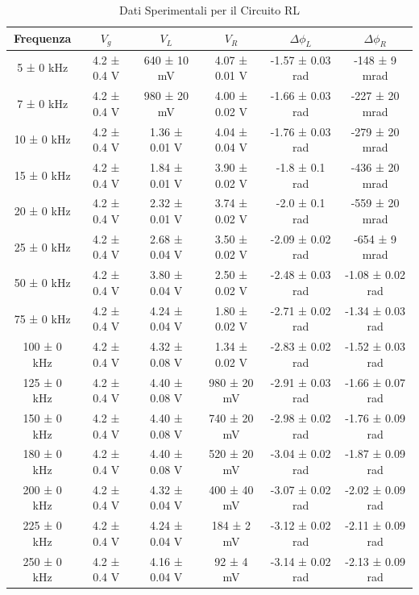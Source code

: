 \documentclass[a4paper]{article}
\begin{document}
\begin{table}[htbp]
    \centering
    \begin{tabular}{|c|c|c|c|c|c|}
    \hline
    Frequenza & $V_g$ & $V_L$ & $V_R$ & $\Delta\phi_L$ & $\Delta\phi_R$ \\\hline\hline
    5 ± 0 kHz & 4.2 ± 0.4 V & 640 ± 10 mV & 4.07 ± 0.01 V & -1.57 ± 0.03 rad & -148 ± 9 mrad \\
    7 ± 0 kHz & 4.2 ± 0.4 V & 980 ± 20 mV & 4.00 ± 0.02 V & -1.66 ± 0.03 rad & -227 ± 20 mrad \\
    10 ± 0 kHz & 4.2 ± 0.4 V & 1.36 ± 0.01 V & 4.04 ± 0.04 V & -1.76 ± 0.03 rad & -279 ± 20 mrad \\
    15 ± 0 kHz & 4.2 ± 0.4 V & 1.84 ± 0.01 V & 3.90 ± 0.02 V & -1.8 ± 0.1 rad & -436 ± 20 mrad \\
    20 ± 0 kHz & 4.2 ± 0.4 V & 2.32 ± 0.01 V & 3.74 ± 0.02 V & -2.0 ± 0.1 rad & -559 ± 20 mrad \\
    25 ± 0 kHz & 4.2 ± 0.4 V & 2.68 ± 0.04 V & 3.50 ± 0.02 V & -2.09 ± 0.02 rad & -654 ± 9 mrad \\
    50 ± 0 kHz & 4.2 ± 0.4 V & 3.80 ± 0.04 V & 2.50 ± 0.02 V & -2.48 ± 0.03 rad & -1.08 ± 0.02 rad \\
    75 ± 0 kHz & 4.2 ± 0.4 V & 4.24 ± 0.04 V & 1.80 ± 0.02 V & -2.71 ± 0.02 rad & -1.34 ± 0.03 rad \\
    100 ± 0 kHz & 4.2 ± 0.4 V & 4.32 ± 0.08 V & 1.34 ± 0.02 V & -2.83 ± 0.02 rad & -1.52 ± 0.03 rad \\
    125 ± 0 kHz & 4.2 ± 0.4 V & 4.40 ± 0.08 V & 980 ± 20 mV & -2.91 ± 0.03 rad & -1.66 ± 0.07 rad \\
    150 ± 0 kHz & 4.2 ± 0.4 V & 4.40 ± 0.08 V & 740 ± 20 mV & -2.98 ± 0.02 rad & -1.76 ± 0.09 rad \\
    180 ± 0 kHz & 4.2 ± 0.4 V & 4.40 ± 0.08 V & 520 ± 20 mV & -3.04 ± 0.02 rad & -1.87 ± 0.09 rad \\
    200 ± 0 kHz & 4.2 ± 0.4 V & 4.32 ± 0.04 V & 400 ± 40 mV & -3.07 ± 0.02 rad & -2.02 ± 0.09 rad \\
    225 ± 0 kHz & 4.2 ± 0.4 V & 4.24 ± 0.04 V & 184 ± 2 mV & -3.12 ± 0.02 rad & -2.11 ± 0.09 rad \\
    250 ± 0 kHz & 4.2 ± 0.4 V & 4.16 ± 0.04 V & 92 ± 4 mV & -3.14 ± 0.02 rad & -2.13 ± 0.09 rad \\
    \hline
    \end{tabular}
    \caption{Dati Sperimentali per il Circuito RL}
    \label{tab:dati sperimentali rl}
    \end{table}
\end{document}
